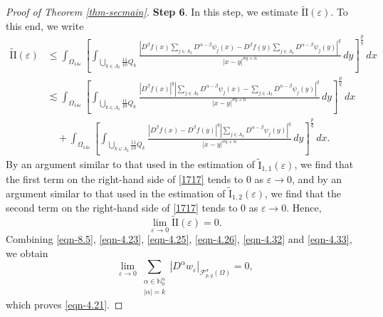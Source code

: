 \documentclass[11pt,twoside]{article}
\def\nn{{\mathbb N}}
\def\nno{\nn_0}
\def\cf{{\mathcal F}}
\def\Qk{\frac{11}{10}Q_k}
\def\az{\alpha}
\def\boz{{\Omega}}
\def\sz{\sigma}
\def\vez{\varepsilon}
\def\we{w_{\varepsilon}}
\def\adk{\sum_{\substack{\az\in\nno^n \\ \lvert \alpha \rvert = k}}}
\def\huae{\varepsilon}
\theoremstyle{mylem}
\theoremstyle{definition}
\numberwithin{equation}{section}
\begin{document}
\begin{proof}[Proof of Theorem \ref{thm-secmain}]
{\bf Step 6}. In this step, we estimate \( \tilde{\mathrm{II}}(\vez) \). To this end, we write
\begin{align}\label{1717}
\tilde{\mathrm{II}}(\vez)
&\leq \int_{\Omega_{14\varepsilon}} \left[ \int_{\bigcup_{k \in \Lambda_2} \Qk} \frac{|D^\beta f(x) \sum_{j\in\Lambda_2}D^{\alpha - \beta} \psi_j(x) - D^\beta f(y) \sum_{j\in\Lambda_2}D^{\alpha - \beta} \psi_j(y)|^q}{|x - y|^{\sz q + n}}\,dy \right]^{\frac{p}{q}}\,dx  \nonumber\\
&\lesssim \int_{\Omega_{14\varepsilon}} \left[ \int_{\bigcup_{k \in \Lambda_2} \Qk} \frac{|D^\beta f(x)|^q |\sum_{j\in\Lambda_2}D^{\alpha - \beta} \psi_j(x) - \sum_{j\in\Lambda_2}D^{\alpha - \beta} \psi_j(y)|^q}{|x - y|^{\sz q + n}}\,dy \right]^{\frac{p}{q}}\,dx \nonumber\\
&\quad+ \int_{\Omega_{14\varepsilon}} \left[ \int_{\bigcup_{k \in \Lambda_2} \Qk} \frac{|D^\beta f(x) - D^\beta f(y)|^q |\sum_{j\in\Lambda_2}D^{\alpha - \beta} \psi_j(y)|^q}{|x - y|^{\sz q + n}}\,dy \right]^{\frac{p}{q}}\,dx.
\end{align}
By an argument similar to that used in the estimation of \( \tilde{\mathrm{I}}_{1,1}(\vez) \), we find that the first term on the right-hand side of \eqref{1717} tends to 0 as $\vez\to 0$, and by an argument similar to that used in the estimation of \( \tilde{\mathrm{I}}_{1,2}(\vez) \), we find that the second term on the right-hand side of \eqref{1717} tends to 0 as $\vez\to 0$. Hence,
\begin{equation}\label{eqn-4.33}
\lim_{\varepsilon \to 0} \tilde{\mathrm{II}}(\vez) = 0.
\end{equation}
Combining \eqref{eqn-8.5}, \eqref{eqn-4.23}, \eqref{eqn-4.25}, \eqref{eqn-4.26}, \eqref{eqn-4.32} and \eqref{eqn-4.33}, we obtain
\[
\lim_{\huae \to 0} \adk \left| D^{\az} \we \right|_{\cf_{p,q}^{\sz}(\boz)}=0,
\]
which proves \eqref{eqn-4.21}.


\end{proof}
\end{document}
